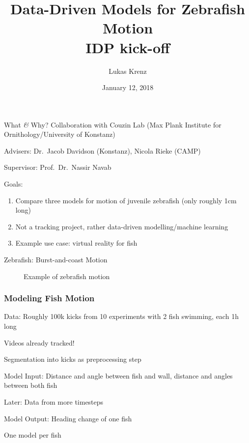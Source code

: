 \documentclass{beamer}
\title{Data-Driven Models for Zebrafish Motion\\IDP kick-off}
\author{Lukas Krenz}
\date{January 12, 2018}
\institute{TUM}
\begin{document}
\maketitle
\begin{frame}{What \textit{\&} Why?}
Collaboration with Couzin Lab (Max Plank Institute for Ornithology/University of Konstanz)

Advisers: Dr.\ Jacob Davidson (Konstanz), Nicola Rieke (CAMP)

Supervisor: Prof.\ Dr.\ Nassir Navab

Goals:
\begin{enumerate}
\item Compare three models for motion of juvenile zebrafish (only roughly 1cm long)
\item Not a tracking project, rather data-driven modelling/machine learning
\item Example use case: virtual reality for fish
\end{enumerate}
\end{frame}
\begin{frame}{Zebrafish: Burst-and-coast Motion} 
    \begin{figure}[H]
    \centering
    \caption{Example of zebrafish motion}
    \label{fig:calovi-sim}
  \end{figure}
\end{frame}

\begin{frame}
  \frametitle{Modeling Fish Motion}
Data: Roughly 100k kicks from 10 experiments with 2 fish swimming, each 1h long

Videos already tracked!

Segmentation into kicks as preprocessing step

Model Input: Distance and angle between fish and wall, distance and angles between both fish

Later: Data from more timesteps

Model Output: Heading change of one fish

One model per fish
\end{frame}
\end{document}
